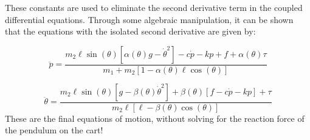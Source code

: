 \documentclass[../notes.tex]{subfiles}
\begin{document}
These constants are used to eliminate the second derivative term in the coupled differential equations. Through some algebraic manipulation, it can be shown that the equations with the isolated second derivative are given by:

\begin{equation*} 
    \ddot{p} = \frac{m_2\ell\sin(\theta)[\alpha(\theta)g-\dot{\theta}^2]-c\dot{p}-kp+f+\alpha(\theta)\tau}{m_1 + m_2[1-\alpha(\theta)\ell\cos(\theta)]}
\end{equation*}

\begin{equation*} 
    \ddot{\theta} = \frac{m_2\ell \sin(\theta)[g - \beta (\theta)\dot{\theta}^2] + \beta (\theta)[f - c\dot{p}-kp] + \tau}{m_2\ell [\ell - \beta (\theta) \cos(\theta)]}
\end{equation*}
These are the final equations of motion, without solving for the reaction force of the pendulum on the cart!
\end{document}
